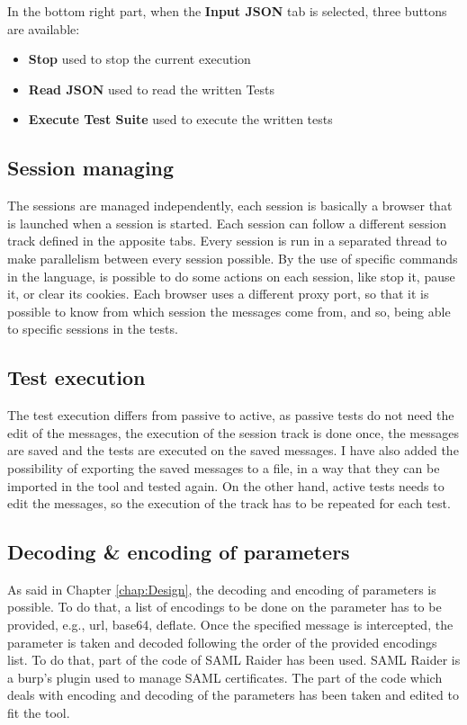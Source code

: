 In the bottom right part, when the \textbf{Input JSON} tab is selected, three buttons are available:
\begin{itemize}
    \item \textbf{Stop} used to stop the current execution
    \item \textbf{Read JSON} used to read the written Tests
    \item \textbf{Execute Test Suite} used to execute the written tests
\end{itemize}

\subsection{Session managing}
The sessions are managed independently, each session is basically a browser that is launched when a session is started. Each session can follow a different \gls{session track} defined in the apposite tabs. Every session is run in a separated thread to make parallelism between every session possible. By the use of specific commands in the language, is possible to do some actions on each session, like stop it, pause it, or clear its cookies. Each browser uses a different proxy port, so that it is possible to know from which session the messages come from, and so, being able to specific sessions in the tests.

\subsection{Test execution}
The test execution differs from passive to active, as passive tests do not need the edit of the messages, the execution of the \gls{session track} is done once, the messages are saved and the tests are executed on the saved messages. I have also added the possibility of exporting the saved messages to a file, in a way that they can be imported in the tool and tested again.
On the other hand, active tests needs to edit the messages, so the execution of the track has to be repeated for each test.

\subsection{Decoding \& encoding of parameters}
As said in Chapter \ref{chap:Design}, the decoding and encoding of parameters is possible. To do that, a list of encodings to be done on the parameter has to be provided, e.g., url, base64, deflate. Once the specified message is intercepted, the parameter is taken and decoded following the order of the provided encodings list. To do that, part of the code of SAML Raider \cite{saml_raider} has been used. SAML Raider is a \Gls{burp}'s plugin used to manage \Gls{SAML} certificates. The part of the code which deals with encoding and decoding of the parameters has been taken and edited to fit the tool.

